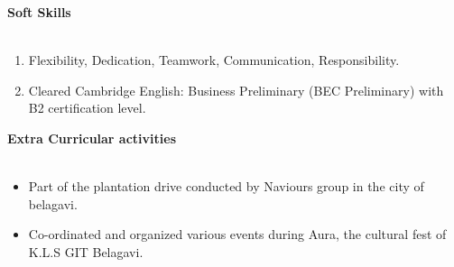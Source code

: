 \documentclass[15pt]{article}
\begin{document}
\vspace{1mm}
\begin{flushleft}
	{\textbf{Soft Skills}} \\
	\vspace{0.5mm}
	\noindent \hrulefill 
	\vspace{0.5mm} \\
	\begin{enumerate}
		\item Flexibility, Dedication, Teamwork, Communication, Responsibility.
		\item Cleared Cambridge English: Business Preliminary (BEC Preliminary) with B2 certification level.
	\end{enumerate}
\end{flushleft}
\vspace{1mm}
\begin{flushleft}
	{\textbf{Extra Curricular activities}} \\
	\vspace{0.5mm}
	\noindent \hrulefill 
	\vspace{0.5mm} \\
	\begin{itemize}
		\item Part of the plantation drive conducted by Naviours group in the city of belagavi.
		\item Co-ordinated and organized various events during Aura, the cultural fest of K.L.S GIT Belagavi.
	\end{itemize}
\end{flushleft}
\end{document}
